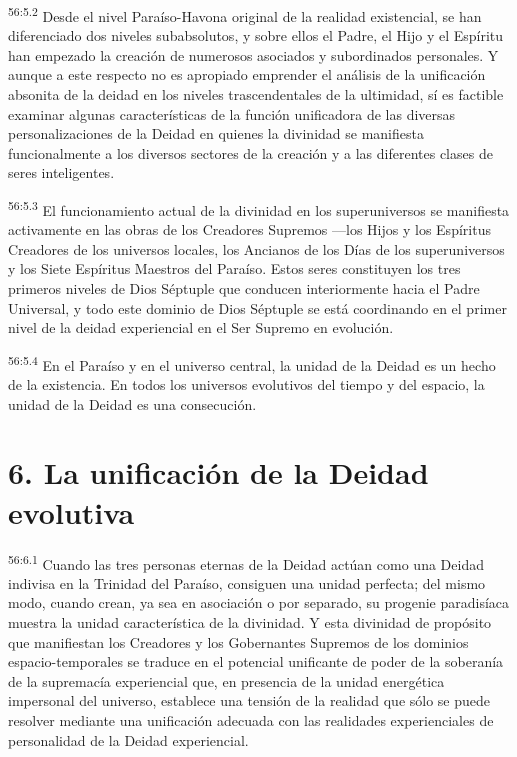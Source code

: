 \par
\textsuperscript{56:5.2} Desde el nivel Paraíso-Havona original de la realidad existencial, se han diferenciado dos niveles subabsolutos, y sobre ellos el Padre, el Hijo y el Espíritu han empezado la creación de numerosos asociados y subordinados personales. Y aunque a este respecto no es apropiado emprender el análisis de la unificación absonita de la deidad en los niveles trascendentales de la ultimidad, sí es factible examinar algunas características de la función unificadora de las diversas personalizaciones de la Deidad en quienes la divinidad se manifiesta funcionalmente a los diversos sectores de la creación y a las diferentes clases de seres inteligentes.

\par
\textsuperscript{56:5.3} El funcionamiento actual de la divinidad en los superuniversos se manifiesta activamente en las obras de los Creadores Supremos ---los Hijos y los Espíritus Creadores de los universos locales, los Ancianos de los Días de los superuniversos y los Siete Espíritus Maestros del Paraíso. Estos seres constituyen los tres primeros niveles de Dios Séptuple que conducen interiormente hacia el Padre Universal, y todo este dominio de Dios Séptuple se está coordinando en el primer nivel de la deidad experiencial en el Ser Supremo en evolución.

\par
\textsuperscript{56:5.4} En el Paraíso y en el universo central, la unidad de la Deidad es un hecho de la existencia. En todos los universos evolutivos del tiempo y del espacio, la unidad de la Deidad es una consecución.

\section*{6. La unificación de la Deidad evolutiva}
\par
\textsuperscript{56:6.1} Cuando las tres personas eternas de la Deidad actúan como una Deidad indivisa en la Trinidad del Paraíso, consiguen una unidad perfecta; del mismo modo, cuando crean, ya sea en asociación o por separado, su progenie paradisíaca muestra la unidad característica de la divinidad. Y esta divinidad de propósito que manifiestan los Creadores y los Gobernantes Supremos de los dominios espacio-temporales se traduce en el potencial unificante de poder de la soberanía de la supremacía experiencial que, en presencia de la unidad energética impersonal del universo, establece una tensión de la realidad que sólo se puede resolver mediante una unificación adecuada con las realidades experienciales de personalidad de la Deidad experiencial.

